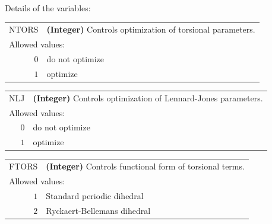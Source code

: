 \documentclass[10pt,a4paper,openany]{memoir}
\numberwithin{equation}{section}
\begin{document}
\noindent Details of the variables:
\vspace{2ex}

{
\begin{tabular}{r@{ : }l}
\label{descr:ntors}
     NTORS&\textbf{(Integer)} Controls optimization of torsional parameters.                                                       \\ 
\multicolumn{2}{l}{Allowed values:} \\ 
     \(0\)&do not optimize                                                                                      \\ 
     \(1\)&optimize                                                                                             \\ 
\end{tabular}
\vspace{1ex}
}

{
\begin{tabular}{r@{ : }l}
\label{descr:nlj}
       NLJ&\textbf{(Integer)} Controls optimization of Lennard-Jones parameters.                                                   \\ 
\multicolumn{2}{l}{Allowed values:} \\ 
     \(0\)&do not optimize                                                                                      \\ 
     \(1\)&optimize                                                                                             \\ 
\end{tabular}
\vspace{1ex}
}


{
\begin{tabular}{r@{ : }l}
\label{descr:ftors}
     FTORS&\textbf{(Integer)} Controls functional form of torsional terms.                                                         \\ 
\multicolumn{2}{l}{Allowed values:} \\ 
     \(1\)&Standard periodic dihedral                                                                           \\ 
     \(2\)&Ryckaert-Bellemans dihedral                                                                          \\ 
\end{tabular}
\vspace{1ex}
}
\end{document}
